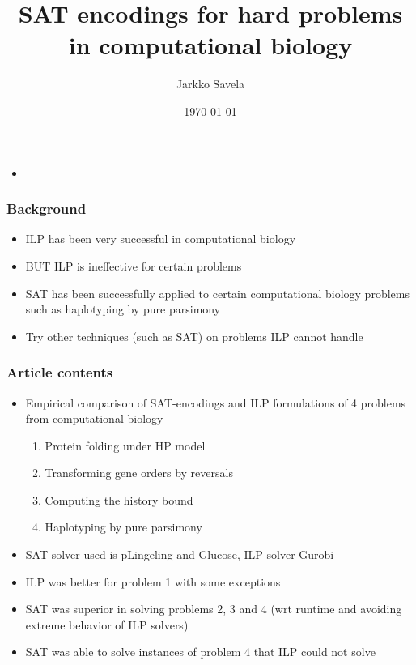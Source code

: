 \documentclass[handout]{beamer}
\title[]{SAT encodings for hard problems in computational biology} %
\author{Jarkko Savela} %
\institute{University of Helsinki} %
\date{\today} %
\begin{document}
\begin{frame}
\titlepage %
\end{frame}

\begin{frame}
\begin{itemize}
\item {}
\end{itemize}
\end{frame}

\begin{frame}
\frametitle{Background}
\begin{itemize}
\item ILP has been very successful in computational biology~\cite{gusfield2019integer}
\item BUT ILP is ineffective for certain problems
\item SAT has been successfully applied to certain computational biology problems such as haplotyping by pure parsimony~\cite{DBLP:conf/aaai/LynceM06, DBLP:journals/anor/GracaMLO11, DBLP:journals/jda/JagerCZ16}
\item Try other techniques (such as SAT) on problems ILP cannot handle
\end{itemize}
\end{frame}

\begin{frame}
\frametitle{Article contents}
\begin{itemize}
\item Empirical comparison of SAT-encodings and ILP formulations of 4 problems from computational biology
\begin{enumerate}
\item Protein folding under HP model
\item Transforming gene orders by reversals
\item Computing the history bound
\item Haplotyping by pure parsimony
\end{enumerate}
\item SAT solver used is pLingeling and Glucose, ILP solver Gurobi
\item ILP was better for problem 1 with some exceptions
\item SAT was superior in solving problems 2, 3 and 4 (wrt runtime and avoiding extreme behavior of ILP solvers)
\item SAT was able to solve instances of problem 4 that ILP could not solve
\end{itemize}
\end{frame}
\end{document}

